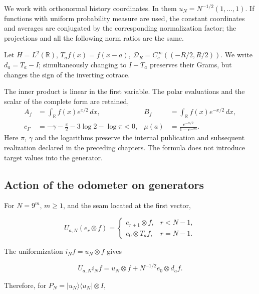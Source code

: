 We work with orthonormal history coordinates. In them \(u_N=N^{-1/2}(1,\ldots,1)\). If functions with uniform probability measure are used, the constant coordinates and averages are conjugated by the corresponding normalization factor; the projections and all the following norm ratios are the same.

Let \(H=L^2(\mathbb R)\), \(T_af(x)=f(x-a)\), \(\mathcal D_R=C_c^\infty((-R/2,R/2))\). We write \(d_a=T_a-I\); simultaneously changing to \(I-T_a\) preserves their Grams, but changes the sign of the inverting cotrace.

The inner product is linear in the first variable. The polar
evaluations and the scalar of the complete form are retained,
\begin{equation}
\begin{aligned}
A_f&=\int_{\mathbb R}f(x)e^{x/2}\,dx,
&B_f&=\int_{\mathbb R}f(x)e^{-x/2}\,dx,\\
c_\Gamma&=-\gamma-\frac\pi2-3\log2-\log\pi<0,
&\mu(a)&=\frac{e^{-a/2}}{1-e^{-2a}}.
\end{aligned}
\label{viii:gamma-add-def-evaluaciones}
\end{equation}
Here \(\pi\), \(\gamma\) and the logarithms preserve the internal
publication and subsequent realization declared in the preceding chapters.
The formula does not introduce target values into the generator.

\subsection{Action of the odometer on generators}
\label{viii:gamma-add-sub-47}

For \(N=9^m\), \(m\ge1\), and the seam located at the first vector,

\begin{equation}
U_{a,N}(e_r\otimes f)=
\begin{cases}
e_{r+1}\otimes f,&r<N-1,\\
e_0\otimes T_af,&r=N-1.
\end{cases}
\label{viii:gamma-add-display-1}
\end{equation}

The uniformization \(i_Nf=u_N\otimes f\) gives

\begin{equation}
U_{a,N}i_Nf
=u_N\otimes f+N^{-1/2}e_0\otimes d_af.
\label{viii:gamma-add-display-2}
\end{equation}

Therefore, for \(P_N=|u_N\rangle\langle u_N|\otimes I\),

